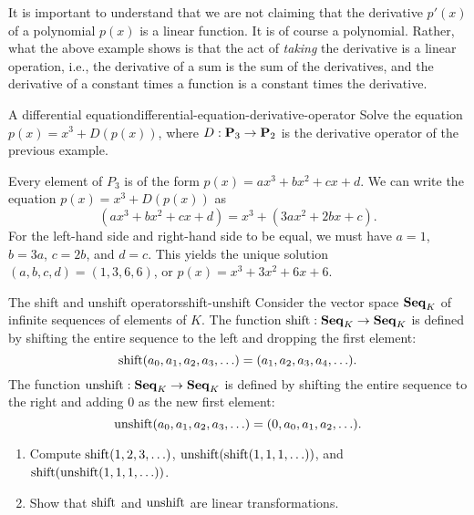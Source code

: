 It is important to understand that we are not claiming that the
derivative $p'(x)$ of a polynomial $p(x)$ is a linear function. It is
of course a polynomial. Rather, what the above example shows is that
the act of {\em taking} the derivative is a linear operation, i.e.,
the derivative of a sum is the sum of the derivatives, and the
derivative of a constant times a function is a constant times the
derivative.

\begin{example}{A differential equation}{differential-equation-derivative-operator}
  Solve the equation $p(x) = x^3 + D(p(x))$, where
  $D:\mathbf{P}_3\to\mathbf{P}_2$ is the derivative operator of the previous example.
\end{example}

\begin{solution}
  Every element of $P_3$ is of the form $p(x) = ax^3 + bx^2 + cx + d$.
  We can write the equation $p(x) = x^3 + D(p(x))$ as
  \begin{equation*}
    (ax^3 + bx^2 + cx + d) = x^3 + (3ax^2 + 2bx + c).
  \end{equation*}
  For the left-hand side and right-hand side to be equal, we must have
  $a=1$, $b=3a$, $c=2b$, and $d=c$. This yields the unique solution
  $(a,b,c,d) = (1,3,6,6)$, or $p(x) = x^3+3x^2+6x+6$.
\end{solution}

\begin{example}{The shift and unshift operators}{shift-unshift}
  Consider the vector space $\mathbf{Seq}_K$ of infinite sequences of elements
  of $K$. The function $\shift:\Seq_K\to\Seq_K$ is defined by shifting
  the entire sequence to the left and dropping the first element:
  \begin{equation*}
    \shift(a_0,a_1,a_2,a_3,\ldots) = (a_1,a_2,a_3,a_4,\ldots).
  \end{equation*}
  The function $\unshift:\Seq_K\to\Seq_K$ is defined by shifting the
  entire sequence to the right and adding $0$ as the new first
  element:
  \begin{equation*}
    \unshift(a_0,a_1,a_2,a_3,\ldots) = (0,a_0,a_1,a_2,\ldots).
  \end{equation*}
  \begin{enumialphparenastyle}
    \begin{enumerate}
    \item Compute $\shift(1,2,3,\ldots)$,
      $\unshift(\shift(1,1,1,\ldots))$, and
      $\shift(\unshift(1,1,1,\ldots))$.
    \item Show that $\shift$ and $\unshift$ are linear transformations.
    \end{enumerate}
  \end{enumialphparenastyle}
\end{example}

